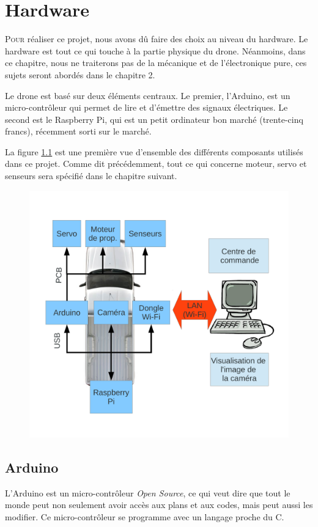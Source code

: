 \documentclass[a4paper,11pt]{report}
\begin{document}
{\chapter{Hardware}


\lettrine{P}{our} réaliser ce projet, nous avons dû faire des choix au niveau
du hardware. Le hardware est tout ce qui touche à la partie physique du drone.
Néanmoins, dans ce chapitre, nous ne traiterons pas de la mécanique et de
l'électronique pure, ces sujets
seront abordés dans le chapitre 2. 

Le drone est basé sur deux éléments centraux. Le
premier, l'Arduino, est un micro-contrôleur qui permet de lire et d'émettre
des signaux électriques.
Le second est le Raspberry Pi, qui est un petit ordinateur bon marché
(trente-cinq francs), récemment sorti sur le marché. 

La figure
\ref{SchemaProjet} est une première vue d'ensemble des différents composants
utilisés dans ce projet. Comme dit précédemment, tout ce qui concerne moteur,
servo et senseurs sera spécifié dans le chapitre suivant. 

\begin{figure}[h]
\includegraphics[width = 1.0\textwidth]{SchemaPres.pdf}
\caption[Schéma du hardware]{\label{SchemaProjet}}
\end{figure}

\section{Arduino}
L'Arduino \label{Arduino} \cite{Arduino} est un micro-contrôleur \textit{Open Source}, ce qui veut dire que tout le monde peut non seulement avoir accès aux plans et aux codes, mais peut aussi les modifier.\cite{openSource} Ce micro-contrôleur se programme avec un langage proche du C. 


}
\end{document}
